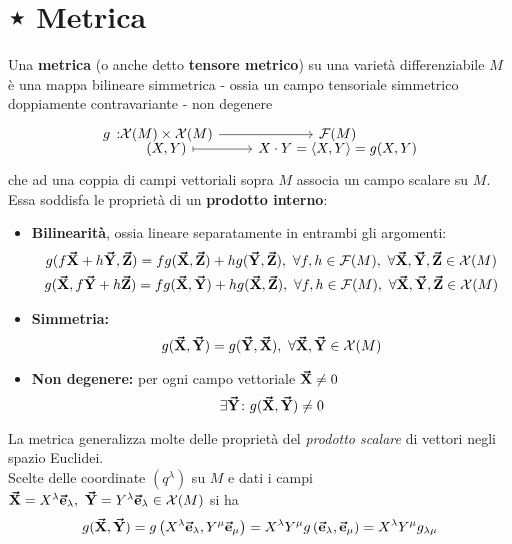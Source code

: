 \section{⋆ Metrica}
\begin{define}[Metrica]
	Una \textbf{metrica} (o anche detto \textbf{tensore metrico}) su una varietà differenziabile $M$ è una mappa bilineare simmetrica - ossia un campo tensoriale simmetrico doppiamente contravariante - non degenere
	\begin{equation}
		\funztot[g]{\mathcal{X}(M)\times \mathcal{X}(M)}{\mathcal{F}(M)}{\left(X,Y\right)}{X\cdot Y=\left<X,Y\right>=g(X,Y)}
	\end{equation}
	che ad una coppia di campi vettoriali sopra $M$ associa un campo scalare su $M$. Essa soddisfa le proprietà di un \textbf{prodotto interno}:
	\begin{itemize}
		\item \textbf{Bilinearità}, ossia lineare separatamente in entrambi gli argomenti:
		\begin{gather}
			g(f\vba{X}+h\vba{Y},\vba{Z})=fg(\vba{X},\vba{Z})+hg(\vba{Y},\vba{Z}),\ \forall f,h\in \mathcal{F}(M),\ \forall \vba{X},\vba{Y},\vba{Z}\in\mathcal{X}(M)\\
			g(\vba{X},f\vba{Y}+h\vba{Z})=fg(\vba{X},\vba{Y})+hg(\vba{X},\vba{Z}),\ \forall f,h\in \mathcal{F}(M),\ \forall \vba{X},\vba{Y},\vba{Z}\in\mathcal{X}(M)
		\end{gather}
		\item \textbf{Simmetria:}
		\begin{equation}
			g(\vb*{\va{X}},\vb*{\va{Y}})=g(\vb*{\va{Y}},\vb*{\va{X}}),\ \forall \vb*{\va{X}},\vb*{\va{Y}}\in\mathcal{X}(M)
		\end{equation}
		\item  \textbf{Non degenere:} per ogni campo vettoriale $\vb*{\va{X}}\neq 0$
		\begin{equation}
			\exists \vb*{\va{Y}}\colon g(\vb*{\va{X}},\vb*{\va{Y}})\neq 0
		\end{equation}
	\end{itemize}
\end{define}
La metrica generalizza molte delle proprietà del \textit{prodotto scalare} di vettori negli spazio Euclidei.\\
Scelte delle coordinate $(q^\lambda)$ su $M$ e dati i campi $\vba{X}=X^{\lambda}\vba{e}_{\lambda},\ \vba{Y}=Y^{\lambda}\vba{e}_{\lambda}\in\mathcal{X}(M)$ si ha
\begin{equation*}
	g(\vb*{\va{X}},\vb*{\va{Y}})=g\left(X^\lambda\vb*{\va{e}}_\lambda,Y^\mu\vb*{\va{e}}_\mu\right)=X^\lambda Y^\mu g\left(\vb*{\va{e}}_\lambda,\vb*{\va{e}}_\mu\right)=X^\lambda Y^\mu g_{\lambda \mu}
\end{equation*}
